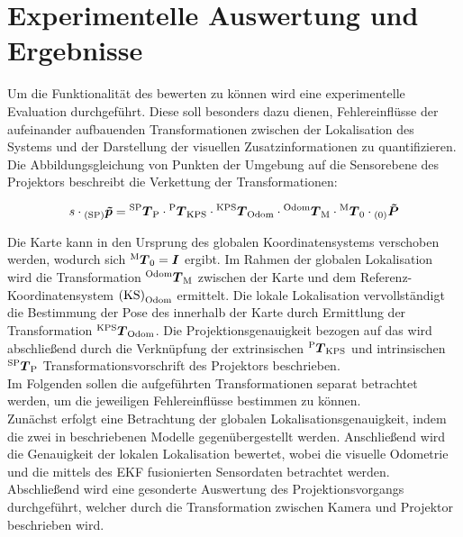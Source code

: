 \chapter{Experimentelle Auswertung und Ergebnisse}
\label{chap.results}
\prever{
}


Um die Funktionalität des  bewerten zu können wird eine experimentelle Evaluation durchgeführt. Diese soll besonders dazu dienen, Fehlereinflüsse der aufeinander aufbauenden Transformationen zwischen der Lokalisation des Systems und der Darstellung der visuellen Zusatzinformationen zu quantifizieren. Die Abbildungsgleichung von Punkten der Umgebung auf die Sensorebene des Projektors beschreibt die Verkettung der Transformationen:

\begin{equation}
s \cdot {_{{\mathrm{(SP)}}}}\mbox{\boldmath{$\tilde{p}$}} = {^{\mathrm{SP}}\mbox{\boldmath{$T$}}_{\mathrm{P}}}\cdot{^{\mathrm{P}}\mbox{\boldmath{$T$}}_{\mathrm{KPS}}}\cdot{^{\mathrm{KPS}}\mbox{\boldmath{$T$}}_{\mathrm{Odom}}}\cdot{^{\mathrm{Odom}}\mbox{\boldmath{$T$}}_{\mathrm{M}}}\cdot{^{\mathrm{M}}\mbox{\boldmath{$T$}}_{\mathrm{0}}}\cdot{_{{\mathrm{(0)}}}}\mbox{\boldmath{$\tilde{P}$}}
\end{equation}

Die Karte kann in den Ursprung des globalen Koordinatensystems verschoben werden, wodurch sich ${^{\mathrm{M}}\mbox{\boldmath{$T$}}_{\mathrm{0}}} = \mbox{\boldmath{$I$}}$ ergibt. Im Rahmen der globalen Lokalisation wird die Transformation ${^{\mathrm{Odom}}\mbox{\boldmath{$T$}}_{\mathrm{M}}}$ zwischen der Karte und dem Referenz-Koordinatensystem ${\mathrm{(KS)}}_{\mathrm{Odom}}$ ermittelt. Die lokale Lokalisation vervollständigt die Bestimmung der Pose des  innerhalb der Karte durch Ermittlung der Transformation ${^{\mathrm{KPS}}\mbox{\boldmath{$T$}}_{\mathrm{Odom}}}$. Die Projektionsgenauigkeit bezogen auf das \kps{} wird abschließend durch die Verknüpfung der extrinsischen ${^{\mathrm{P}}\mbox{\boldmath{$T$}}_{\mathrm{KPS}}}$ und intrinsischen ${^{\mathrm{SP}}\mbox{\boldmath{$T$}}_{\mathrm{P}}}$ Transformationsvorschrift des Projektors beschrieben.\\
Im Folgenden sollen die aufgeführten Transformationen separat betrachtet werden, um die jeweiligen Fehlereinflüsse bestimmen zu können.\\

\prever{
}
Zunächst erfolgt eine Betrachtung der globalen Lokalisationsgenauigkeit, indem die zwei in  beschriebenen Modelle gegenübergestellt werden. Anschließend wird die Genauigkeit der lokalen Lokalisation bewertet, wobei die visuelle Odometrie und die mittels des EKF fusionierten Sensordaten betrachtet werden. Abschließend wird eine gesonderte Auswertung des Projektionsvorgangs durchgeführt, welcher durch die Transformation zwischen Kamera und Projektor beschrieben wird.\\

